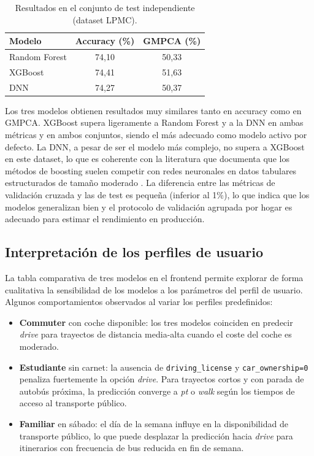 \begin{table}[htbp]
  \caption{Resultados en el conjunto de test independiente (dataset LPMC).}
  \label{tab:lpmc_test_results}
  \centering
  \begin{tabular}{lcc}
    \toprule
    \textbf{Modelo} & \textbf{Accuracy (\%)} & \textbf{GMPCA (\%)} \\
    \midrule
    Random Forest & 74,10 & 50,33 \\
    XGBoost       & 74,41 & 51,63 \\
    DNN           & 74,27 & 50,37 \\
    \bottomrule
  \end{tabular}
\end{table}

Los tres modelos obtienen resultados muy similares tanto en accuracy como en GMPCA. XGBoost supera ligeramente a Random Forest y a la DNN en ambas métricas y en ambos conjuntos, siendo el más adecuado como modelo activo por defecto. La DNN, a pesar de ser el modelo más complejo, no supera a XGBoost en este dataset, lo que es coherente con la literatura que documenta que los métodos de boosting suelen competir con redes neuronales en datos tabulares estructurados de tamaño moderado \cite{Grinsztajn2022TreesVsNNs}. La diferencia entre las métricas de validación cruzada y las de test es pequeña (inferior al 1\%), lo que indica que los modelos generalizan bien y el protocolo de validación agrupada por hogar es adecuado para estimar el rendimiento en producción.

\subsection{Interpretación de los perfiles de usuario}

La tabla comparativa de tres modelos en el frontend permite explorar de forma cualitativa la sensibilidad de los modelos a los parámetros del perfil de usuario. Algunos comportamientos observados al variar los perfiles predefinidos:

\begin{itemize}
  \item \textbf{Commuter} con coche disponible: los tres modelos coinciden en predecir \textit{drive} para trayectos de distancia media-alta cuando el coste del coche es moderado.
  \item \textbf{Estudiante} sin carnet: la ausencia de \texttt{driving\_license} y \texttt{car\_ownership=0} penaliza fuertemente la opción \textit{drive}. Para trayectos cortos y con parada de autobús próxima, la predicción converge a \textit{pt} o \textit{walk} según los tiempos de acceso al transporte público.
  \item \textbf{Familiar} en sábado: el día de la semana influye en la disponibilidad de transporte público, lo que puede desplazar la predicción hacia \textit{drive} para itinerarios con frecuencia de bus reducida en fin de semana.
\end{itemize}


